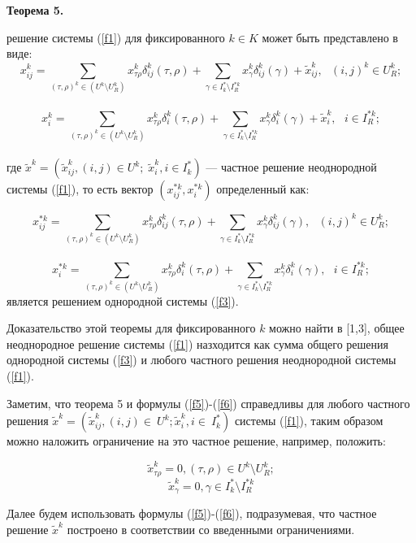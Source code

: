 \documentclass[14pt]{extarticle}%
\begin{document}
    \textbf{Теорема 5.}  { решение системы (\ref{f1}) для фиксированного $k\in K$ может быть представлено в виде:
    \begin{equation}
        x^k_{ij}=\sum_{(\tau, \rho)^k\in (U^k\setminus U^k_R)}x^k_{\tau \rho}\delta^k_{ij}(\tau,\rho)+\sum_{\gamma\in I^*_k\setminus I^{*k}_R}x^k_\gamma\delta^k_{ij}(\gamma)+\widetilde x^k_{ij},\,\,\,\, (i,j)^k\in U^k_R;\label{f5}\end{equation}
    \\
    \begin{equation}
        x^k_i=\sum_{(\tau, \rho)^k\in (U^k\setminus U^k_R)}x^k_{\tau \rho}\delta^k_{i}(\tau,\rho)+\sum_{\gamma\in I^*_k\setminus I^{*k}_R}x^k_\gamma\delta^k_{i}(\gamma)+\widetilde x^k_{i},\,\,\,\, i\in I^{*k}_R;\label{f6}\end{equation}
        \\
        где $\widetilde x^k=(\widetilde x^k_{ij}, (i,j)\in U^k;\; \widetilde x^k_i, i\in I^*_k)$ --- частное решение неоднородной системы (\ref{f1}), то есть вектор $(x^{*k}_{ij},x^{*k}_i)$ определенный как:
        
        $$
        x^{*k}_{ij}=\sum_{(\tau, \rho)^k\in (U^k\setminus U^k_R)}x^k_{\tau \rho}\delta^k_{ij}(\tau,\rho)+\sum_{\gamma\in I^*_k\setminus I^{*k}_R}x^k_\gamma\delta^k_{ij}(\gamma),\,\,\,\, (i,j)^k\in U^k_R;$$
    \\
    $$
        x^{*k}_i=\sum_{(\tau, \rho)^k\in (U^k\setminus U^k_R)}x^k_{\tau \rho}\delta^k_{i}(\tau,\rho)+\sum_{\gamma\in I^*_k\setminus I^{*k}_R}x^k_\gamma\delta^k_{i}(\gamma),\,\,\,\, i\in I^{*k}_R;$$
    является решением однородной системы (\ref{f3}).}

Доказательство этой теоремы для фиксированного $k$ можно найти в [1,3], общее неоднородное решение системы (\ref{f1}) назходится как сумма общего решения однородной системы (\ref{f3}) и любого частного решения неоднородной системы (\ref{f1}).

Заметим, что теорема 5 и формулы (\ref{f5})-(\ref{f6}) справедливы для любого частного решения $\widetilde x^k=(\widetilde x^k_{ij}, (i,j)\in~U^k; \widetilde x^k_i, i\in~I^*_k)$ системы (\ref{f1}), таким образом можно наложить ограничение на это частное решение, например, положить:

$$\widetilde x^k_{\tau\rho}=0, (\tau,\rho)\in U^k\setminus U^k_R;$$
$$ \widetilde x^k_\gamma=0, \gamma\in I^*_k\setminus I^{*k}_R$$


Далее будем использовать формулы (\ref{f5})-(\ref{f6}), подразумевая, что частное решение $\widetilde x^k$ построено в соответствии со введенными ограничениями.
\end{document}
